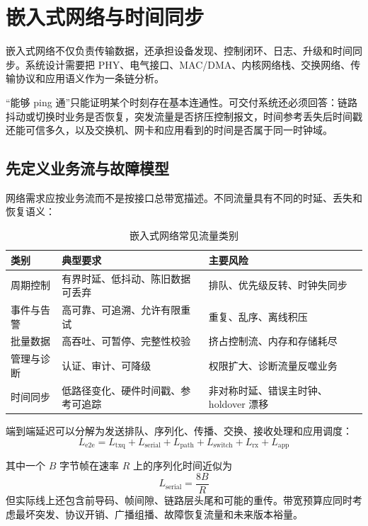 \chapter{嵌入式网络与时间同步}
\label{chap:embedded-network-time}

嵌入式网络不仅负责传输数据，还承担设备发现、控制闭环、日志、升级和时间同步。系统设计需要把 PHY、电气接口、MAC/DMA、内核网络栈、交换网络、传输协议和应用语义作为一条链分析。

“能够 ping 通”只能证明某个时刻存在基本连通性。可交付系统还必须回答：链路抖动或切换时业务是否恢复，突发流量是否挤压控制报文，时间参考丢失后时间戳还能可信多久，以及交换机、网卡和应用看到的时间是否属于同一时钟域。

\section{先定义业务流与故障模型}

网络需求应按业务流而不是按接口总带宽描述。不同流量具有不同的时延、丢失和恢复语义：

\begin{table}[htbp]
  \centering
  \caption{嵌入式网络常见流量类别}
  \small
  \begin{tabular}{p{25mm}p{50mm}p{55mm}}
    \hline
    类别 & 典型要求 & 主要风险 \\
    \hline
    周期控制 & 有界时延、低抖动、陈旧数据可丢弃 & 排队、优先级反转、时钟失同步 \\
    事件与告警 & 高可靠、可追溯、允许有限重试 & 重复、乱序、离线积压 \\
    批量数据 & 高吞吐、可暂停、完整性校验 & 挤占控制流、内存和存储耗尽 \\
    管理与诊断 & 认证、审计、可降级 & 权限扩大、诊断流量反噬业务 \\
    时间同步 & 低路径变化、硬件时间戳、参考可追踪 & 非对称时延、错误主时钟、holdover 漂移 \\
    \hline
  \end{tabular}
\end{table}

端到端延迟可以分解为发送排队、序列化、传播、交换、接收处理和应用调度：
\begin{equation}
  L_{\mathrm{e2e}} =
  L_{\mathrm{txq}} + L_{\mathrm{serial}} + L_{\mathrm{path}} +
  L_{\mathrm{switch}} + L_{\mathrm{rx}} + L_{\mathrm{app}}
\end{equation}

其中一个 $B$ 字节帧在速率 $R$ 上的序列化时间近似为
\begin{equation}
  L_{\mathrm{serial}} = \frac{8B}{R}
\end{equation}
但实际线上还包含前导码、帧间隙、链路层头尾和可能的重传。带宽预算应同时考虑最坏突发、协议开销、广播组播、故障恢复流量和未来版本裕量。

